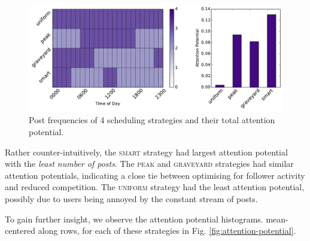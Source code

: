 \documentclass[onecolumn, 12 pt, doublespace, fullpage, letterpaper]{report}
\begin{document}
\begin{figure}
    \includegraphics[width=\linewidth]{schedule_performance}
    \caption[Post frequencies and attention potential of the selected scheduling strategies.]{Post frequencies of 4 scheduling strategies and their total attention potential.}
    \label{fig:performance}
\end{figure}

Rather counter-intuitively, the \textsc{smart} strategy had largest attention potential with the \textit{least number of posts}. The \textsc{peak} and \textsc{graveyard} strategies had similar attention potentials, indicating a close tie between optimising for follower activity and reduced competition. The \textsc{uniform} strategy had the least attention potential, possibly due to users being annoyed by the constant stream of posts.

To gain further insight, we observe the attention potential histograms. mean-centered along rows, for each of these strategies in Fig. \ref{fig:attention-potential}.
\end{document}
